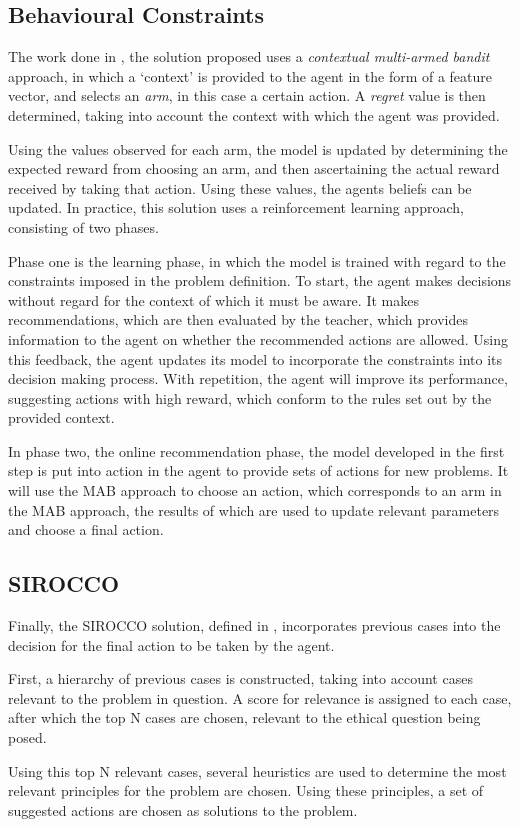 \documentclass{svproc}
\begin{document}
\subsection{Behavioural Constraints}
\par
The work done in \cite{balakrishnan}, the solution proposed uses a \textit{contextual multi-armed bandit} approach, in which a `context' is provided to the agent in the form of a feature vector, and selects an \textit{arm}, in this case a certain action. A \textit{regret} value is then determined, taking into account the context with which the agent was provided.
\par
Using the values observed for each arm, the model is updated by determining the expected reward from choosing an arm, and then ascertaining the actual reward received by taking that action. Using these values, the agents beliefs can be updated. In practice, this solution uses a reinforcement learning approach, consisting of two phases.
\par
Phase one is the learning phase, in which the model is trained with regard to the constraints imposed in the problem definition. To start, the agent makes decisions without regard for the context of which it must be aware. It makes recommendations, which are then evaluated by the teacher, which provides information to the agent on whether the recommended actions are allowed. Using this feedback, the agent updates its model to incorporate the constraints into its decision making process. With repetition, the agent will improve its performance, suggesting actions with high reward, which conform to the rules set out by the provided context.
\par
In phase two, the online recommendation phase, the model developed in the first step is put into action in the agent to provide sets of actions for new problems. It will use the MAB approach to choose an action, which corresponds to an arm in the MAB approach, the results of which are used to update relevant parameters and choose a final action.


\subsection{SIROCCO}
\par
Finally, the SIROCCO solution, defined in \cite{sirocco}, incorporates previous cases into the decision for the final action to be taken by the agent.
\par
First, a hierarchy of previous cases is constructed, taking into account cases relevant to the problem in question. A score for relevance is assigned to each case, after which the top N cases are chosen, relevant to the ethical question being posed.
\par
Using this top N relevant cases, several heuristics are used to determine the most relevant principles for the problem are chosen. Using these principles, a set of suggested actions are chosen as solutions to the problem.
\end{document}
